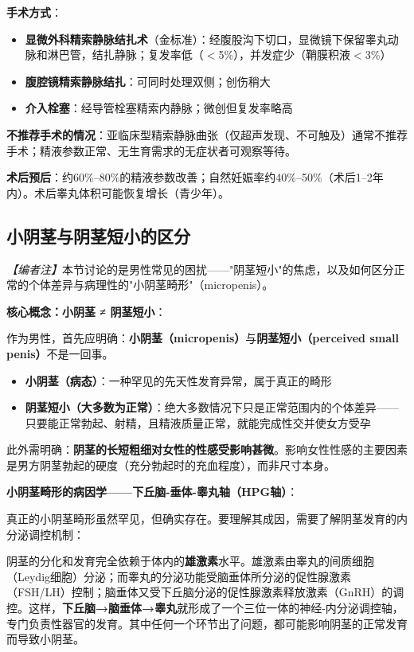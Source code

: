 \textbf{手术方式}：
\begin{itemize}[leftmargin=2cm]
	\item \textbf{显微外科精索静脉结扎术}（金标准）：经腹股沟下切口，显微镜下保留睾丸动脉和淋巴管，结扎静脉；复发率低（$<$5\%），并发症少（鞘膜积液$<$3\%）
	\item \textbf{腹腔镜精索静脉结扎}：可同时处理双侧；创伤稍大
	\item \textbf{介入栓塞}：经导管栓塞精索内静脉；微创但复发率略高
\end{itemize}

\textbf{不推荐手术的情况}：亚临床型精索静脉曲张（仅超声发现、不可触及）通常不推荐手术；精液参数正常、无生育需求的无症状者可观察等待。

\textbf{术后预后}：约60\%--80\%的精液参数改善；自然妊娠率约40\%--50\%（术后1--2年内）。术后睾丸体积可能恢复增长（青少年）。

\subsection{小阴茎与阴茎短小的区分}

\noindent\textit{【编者注】}本节讨论的是男性常见的困扰——"阴茎短小"的焦虑，以及如何区分正常的个体差异与病理性的"小阴茎畸形"（micropenis）。

\vspace{0.5em}
\noindent\textbf{核心概念：小阴茎 ≠ 阴茎短小}：

作为男性，首先应明确：\textbf{小阴茎（micropenis）}与\textbf{阴茎短小（perceived small penis）}不是一回事。

\begin{itemize}
	\item \textbf{小阴茎（病态）}：一种罕见的先天性发育异常，属于真正的畸形
	\item \textbf{阴茎短小（大多数为正常）}：绝大多数情况下只是正常范围内的个体差异——只要能正常勃起、射精，且精液质量正常，就能完成性交并使女方受孕
\end{itemize}

此外需明确：\textbf{阴茎的长短粗细对女性的性感受影响甚微}。影响女性性感的主要因素是男方阴茎勃起的硬度（充分勃起时的充血程度），而非尺寸本身。

\vspace{0.5em}
\noindent\textbf{小阴茎畸形的病因学——下丘脑-垂体-睾丸轴（HPG轴）}：

真正的小阴茎畸形虽然罕见，但确实存在。要理解其成因，需要了解阴茎发育的内分泌调控机制：

阴茎的分化和发育完全依赖于体内的\textbf{雄激素}水平。雄激素由睾丸的间质细胞（Leydig细胞）分泌；而睾丸的分泌功能受脑垂体所分泌的促性腺激素（FSH/LH）控制；脑垂体又受下丘脑分泌的促性腺激素释放激素（GnRH）的调控。这样，\textbf{下丘脑→脑垂体→睾丸}就形成了一个三位一体的神经-内分泌调控轴，专门负责性器官的发育。其中任何一个环节出了问题，都可能影响阴茎的正常发育而导致小阴茎。

